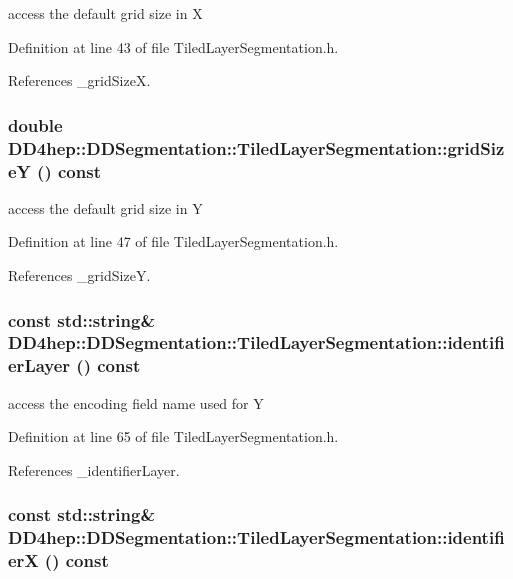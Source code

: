 access the default grid size in X 

Definition at line 43 of file TiledLayerSegmentation.h.

References \_\-gridSizeX.\hypertarget{class_d_d4hep_1_1_d_d_segmentation_1_1_tiled_layer_segmentation_a3319e4007ffe0ea34721e3dcfd5fb4fd}{
\subsubsection[{gridSizeY}]{\setlength{\rightskip}{0pt plus 5cm}double DD4hep::DDSegmentation::TiledLayerSegmentation::gridSizeY () const}}
\label{class_d_d4hep_1_1_d_d_segmentation_1_1_tiled_layer_segmentation_a3319e4007ffe0ea34721e3dcfd5fb4fd}


access the default grid size in Y 

Definition at line 47 of file TiledLayerSegmentation.h.

References \_\-gridSizeY.\hypertarget{class_d_d4hep_1_1_d_d_segmentation_1_1_tiled_layer_segmentation_acc2b11119a4e51ea4667e36fb4db6ef3}{
\subsubsection[{identifierLayer}]{\setlength{\rightskip}{0pt plus 5cm}const std::string\& DD4hep::DDSegmentation::TiledLayerSegmentation::identifierLayer () const}}
\label{class_d_d4hep_1_1_d_d_segmentation_1_1_tiled_layer_segmentation_acc2b11119a4e51ea4667e36fb4db6ef3}


access the encoding field name used for Y 

Definition at line 65 of file TiledLayerSegmentation.h.

References \_\-identifierLayer.\hypertarget{class_d_d4hep_1_1_d_d_segmentation_1_1_tiled_layer_segmentation_aaa6a75aa2ebbb603f8a0cf4d843c8211}{
\subsubsection[{identifierX}]{\setlength{\rightskip}{0pt plus 5cm}const std::string\& DD4hep::DDSegmentation::TiledLayerSegmentation::identifierX () const}}
\label{class_d_d4hep_1_1_d_d_segmentation_1_1_tiled_layer_segmentation_aaa6a75aa2ebbb603f8a0cf4d843c8211}


